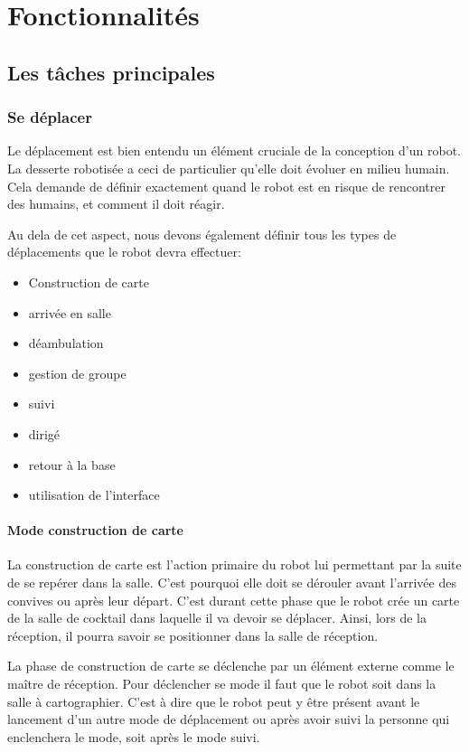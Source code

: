 \chapter{Fonctionnalités}

\section{Les tâches principales}

\subsection{Se déplacer}

Le déplacement est bien entendu un élément cruciale de la conception
d'un robot. La desserte robotisée a ceci de particulier qu'elle doit
évoluer en milieu humain. Cela demande de définir exactement quand le
robot est en risque de rencontrer des humains, et comment il doit
réagir.

Au dela de cet aspect, nous devons également définir tous les types de
déplacements que le robot devra effectuer:

\begin{itemize}
\item Construction de carte
\item arrivée en salle
\item déambulation
\item gestion de groupe
\item suivi
\item dirigé
\item retour à la base
\item utilisation de l'interface
\end{itemize}

\subsubsection{Mode construction de carte}
La construction de carte est l'action primaire du robot lui permettant par la suite de se repérer dans la salle. C'est pourquoi elle doit se dérouler avant l'arrivée des convives ou après leur départ. C'est durant cette phase que le robot crée un carte de la salle de cocktail dans laquelle il va devoir se déplacer. Ainsi, lors de la réception, il pourra savoir se positionner dans la salle de réception.

La phase de construction de carte se déclenche par un élément externe comme le maître de réception. Pour déclencher se mode il faut que le robot soit dans la salle à cartographier. C'est à dire que le robot peut y être présent avant le lancement d'un autre mode de déplacement ou après avoir suivi la personne qui enclenchera le mode, soit après le mode suivi.

